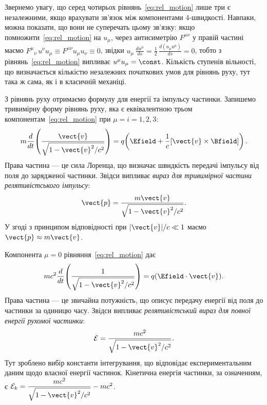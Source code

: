 Звернемо увагу, що серед чотирьох рівнянь~\eqref{eq:rel_motion} лише три є незалежними, якщо врахувати зв'язок між
компонентами 4-швидкості. Навпаки, можна показати, що вони не суперечать цьому зв'язку: якщо
помножити~\eqref{eq:rel_motion} на $u_{\mu}$, через антисиметрію $F^{\mu\nu}$ у правій частині маємо
$F^{\mu}{}_{\nu}\,u^{\nu}u_{\mu} \equiv F^{\mu\nu}u_{\mu}u_{\nu} \equiv 0$, звідки $u_{\mu}\,\frac{du^{\mu}}{ds} =
    \frac12\,\frac{d(u_{\mu}u^{\mu})}{ds} = 0$, тобто з рівнянь~\eqref{eq:rel_motion} випливає $u^{\mu}u_{\mu}=\const$.
Кількість ступенів вільності, що визначається кількістю незалежних початкових умов для рівнянь руху, тут така ж сама, як
і в класичній механіці.

З рівнянь руху отримаємо формулу для енергії та імпульсу частинки. Запишемо тривимірну форму рівнянь руху, яка є
еквівалентною трьом компонентам~\eqref{eq:rel_motion} при $\mu=i=1,2,3$:
\begin{equation*}
    m\frac{d}{dt}\!\left(\frac{\vect{v}}{\sqrt{1-\vect{v}^2/c^2}}\right)
    = q\!\left(\Efield + \frac{1}{c}[\vect{v}\times\Bfield]\right).
\end{equation*}
Права частина --- це сила Лоренца, що визначає швидкість передачі імпульсу від поля до зарядженої
частинки. Звідси випливає \emph{вираз для тривимірної частини релятивістського імпульсу}:
\begin{equation*}
    \vect{p} = \frac{m\vect{v}}{\sqrt{1-\vect{v}^2/c^2}}.
\end{equation*}
У згоді з принципом відповідності при $|\vect{v}|/c\ll 1$ маємо $\vect{p}\approx m\vect{v}$.

Компонента $\mu=0$ рівняння~\eqref{eq:rel_motion} дає
\begin{equation*}
    mc^2\frac{d}{dt}\!\left(\frac{1}{\sqrt{1-\vect{v}^2/c^2}}\right)
    = q(\Efield\cdot\vect{v}).
\end{equation*}
Права частина --- це звичайна потужність, що описує передачу енергії від поля до частинки за одиницю часу. Звідси
випливає \emph{релятивістський вираз для повної енергії рухомої частинки}:
\begin{equation*}
    \mathcal{E} = \frac{mc^2}{\sqrt{1-\vect{v}^2/c^2}}.
\end{equation*}
Тут зроблено вибір константи інтегрування, що відповідає експериментальним даним щодо власної енергії частинок.
Кінетична енергія частинки, за означенням, є $\mathcal{E}_k = \dfrac{mc^2}{\sqrt{1-\vect{v}^2/c^2}} - mc^2$.

